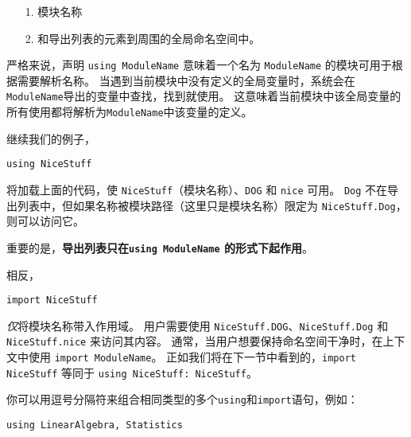 \begin{itemize}
\item[1. ] 模块名称


\item[2. ] 和导出列表的元素到周围的全局命名空间中。

\end{itemize}


严格来说，声明 \texttt{using ModuleName} 意味着一个名为 \texttt{ModuleName} 的模块可用于根据需要解析名称。 当遇到当前模块中没有定义的全局变量时，系统会在\texttt{ModuleName}导出的变量中查找，找到就使用。 这意味着当前模块中该全局变量的所有使用都将解析为\texttt{ModuleName}中该变量的定义。



继续我们的例子，




\begin{verbatim}
using NiceStuff
\end{verbatim}



将加载上面的代码，使 \texttt{NiceStuff}（模块名称）、\texttt{DOG} 和 \texttt{nice} 可用。 \texttt{Dog} 不在导出列表中，但如果名称被模块路径（这里只是模块名称）限定为 \texttt{NiceStuff.Dog}，则可以访问它。



重要的是，\textbf{导出列表只在\texttt{using ModuleName} 的形式下起作用}。



相反，




\begin{verbatim}
import NiceStuff
\end{verbatim}



\emph{仅}将模块名称带入作用域。 用户需要使用 \texttt{NiceStuff.DOG}、\texttt{NiceStuff.Dog} 和 \texttt{NiceStuff.nice} 来访问其内容。 通常，当用户想要保持命名空间干净时，在上下文中使用 \texttt{import ModuleName}。 正如我们将在下一节中看到的，\texttt{import NiceStuff} 等同于 \texttt{using NiceStuff: NiceStuff}。



你可以用逗号分隔符来组合相同类型的多个\texttt{using}和\texttt{import}语句，例如：




\begin{verbatim}
using LinearAlgebra, Statistics
\end{verbatim}




